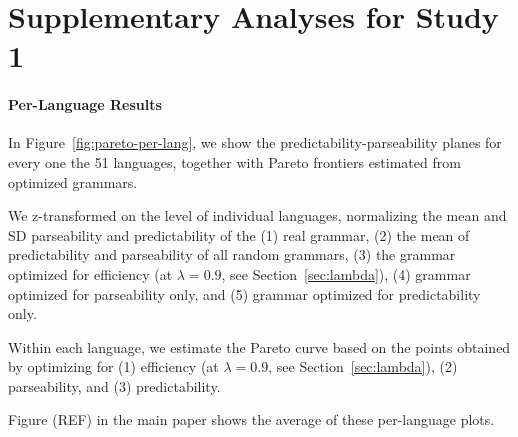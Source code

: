 \documentclass[10pt,twoside,lineno]{article}
\begin{document}
\section{Supplementary Analyses for Study 1}


\paragraph{Per-Language Results}
In Figure~\ref{fig:pareto-per-lang}, we show the predictability-parseability planes for every one the 51 languages, together with Pareto frontiers estimated from optimized grammars. %

We z-transformed on the level of individual languages, normalizing the mean and SD parseability and predictability of the (1) real grammar, (2) the mean of predictability and parseability of all random grammars, (3) the grammar optimized for efficiency (at $\lambda =0.9$, see Section~\ref{sec:lambda}), (4) grammar optimized for parseability only, and (5) grammar optimized for predictability only.

Within each language, we estimate the Pareto curve based on the points obtained by optimizing for (1) efficiency (at $\lambda = 0.9$, see Section~\ref{sec:lambda}), (2) parseability, and (3) predictability.

Figure (REF) in the main paper shows the average of these per-language plots. 
\end{document}

